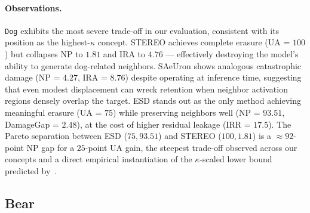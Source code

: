 \paragraph{Observations.}
\texttt{Dog} exhibits the most severe trade-off in our evaluation, consistent with its position as the highest-$\hat\kappa$ concept. STEREO achieves complete erasure (UA = $100$) but collapses NP to $1.81$ and IRA to $4.76$ --- effectively destroying the model's ability to generate dog-related neighbors. SAeUron shows analogous catastrophic damage (NP = $4.27$, IRA = $8.76$) despite operating at inference time, suggesting that even modest displacement can wreck retention when neighbor activation regions densely overlap the target. ESD stands out as the only method achieving meaningful erasure (UA = $75$) while preserving neighbors well (NP = $93.51$, DamageGap = $2.48$), at the cost of higher residual leakage (IRR = $17.5$). The Pareto separation between ESD ($75, 93.51$) and STEREO ($100, 1.81$) is a $\approx 92$-point NP gap for a $25$-point UA gain, the steepest trade-off observed across our concepts and a direct empirical instantiation of the $\kappa$-scaled lower bound predicted by~.


\subsection{Bear}
\label{app:per_concept_bear}

